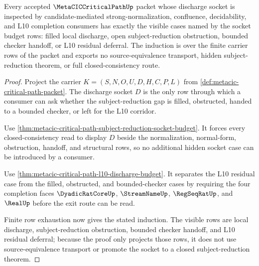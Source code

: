 \begin{theorem}
\label{thm:metacic-critical-path-discharge-socket-case-induction}
Every accepted $\MetaCICCriticalPathUp$ packet whose discharge socket is
inspected by candidate-mediated strong-normalization, confluence,
decidability, and L10 completion consumers has exactly the visible cases named
by the socket budget rows: filled local discharge, open subject-reduction
obstruction, bounded checker handoff, or L10 residual deferral. The induction
is over the finite carrier rows of the packet and exports no source-equivalence
transport, hidden subject-reduction theorem, or full closed-consistency route.
\end{theorem}
\begin{proof}
Project the carrier $K=(S,N,O,U,D,H,C,P,L)$ from
\autoref{def:metacic-critical-path-packet}. The discharge socket $D$ is the
only row through which a consumer can ask whether the subject-reduction gap is
filled, obstructed, handed to a bounded checker, or left for the L10 corridor.

Use \autoref{thm:metacic-critical-path-subject-reduction-socket-budget}. It
forces every closed-consistency read to display $D$ beside the
normalization, normal-form, obstruction, handoff, and structural rows, so no
additional hidden socket case can be introduced by a consumer.

Use \autoref{thm:metacic-critical-path-l10-discharge-budget}. It separates the
L10 residual case from the filled, obstructed, and bounded-checker cases by
requiring the four completion faces $\DyadicRatCoreUp$, $\StreamNameUp$,
$\RegSeqRatUp$, and $\RealUp$ before the exit route can be read.

Finite row exhaustion now gives the stated induction. The visible rows are
local discharge, subject-reduction obstruction, bounded checker handoff, and
L10 residual deferral; because the proof only projects those rows, it does not
use source-equivalence transport or promote the socket to a closed
subject-reduction theorem.
\end{proof}

